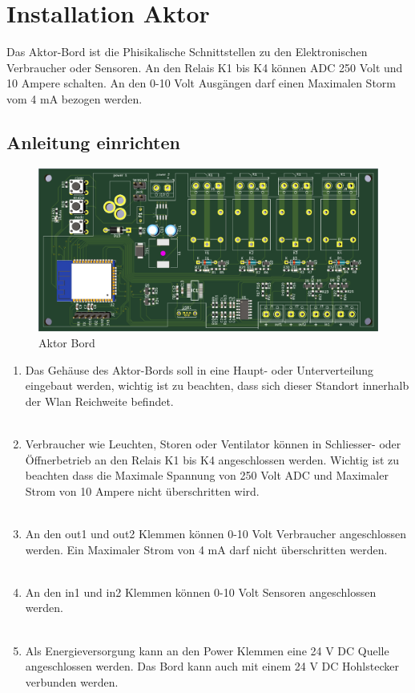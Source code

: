 \clearpage
\section{Installation Aktor}\label{sec:Aktor}
Das Aktor-Bord ist die Phisikalische Schnittstellen zu den Elektronischen Verbraucher oder Sensoren. An den Relais K1 bis K4 können ADC 250 Volt und 10 Ampere schalten. An den 0-10 Volt Ausgängen darf einen Maximalen Storm vom 4 mA bezogen werden.
\subsection{Anleitung einrichten}
\begin{figure}[H]
	\centering
	\includegraphics[width=\textwidth]{graphics/Aktorbaustein.png}
	\caption{Aktor Bord} 	
	\label{pic: OSGILayers}
\end{figure} 

\begin{enumerate}
	\item Das Gehäuse des Aktor-Bords soll in eine Haupt- oder Unterverteilung eingebaut werden, wichtig ist zu beachten, dass sich dieser Standort innerhalb der Wlan Reichweite befindet.\\
	\\
	\item Verbraucher wie Leuchten, Storen oder Ventilator können in Schliesser- oder Öffnerbetrieb an den Relais K1 bis K4 angeschlossen werden. Wichtig ist zu beachten dass die Maximale Spannung von 250 Volt ADC und Maximaler Strom von 10 Ampere nicht überschritten wird.\\
		\\
	\item An den out1 und out2 Klemmen können 0-10 Volt Verbraucher angeschlossen werden. Ein Maximaler Strom von 4 mA darf nicht überschritten werden.\\
	\\
	\item An den in1 und in2 Klemmen können 0-10 Volt Sensoren angeschlossen werden.\\
	\\
	\item Als Energieversorgung kann an den Power Klemmen eine 24 V DC Quelle angeschlossen werden. Das Bord kann auch mit einem 24 V DC Hohlstecker verbunden werden.
\end{enumerate}

